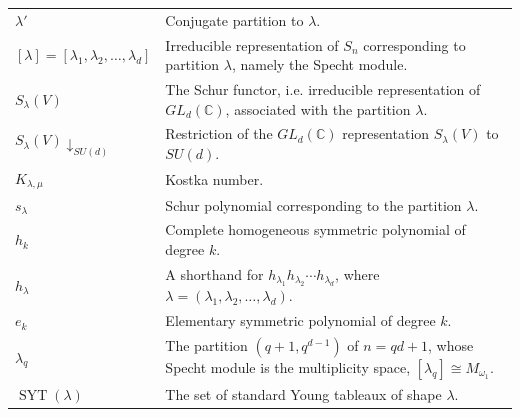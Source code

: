 \documentclass[10pt,twocolumn,superscriptaddress,aps,amsmath,amssymb,citeautoscript,floatfix,prx]{revtex4-2}
\theoremstyle{plain}
\theoremstyle{plain}
\theoremstyle{plain}
\theoremstyle{plain}
\theoremstyle{plain}
\theoremstyle{plain}
\theoremstyle{plain}
\theoremstyle{definition}
\theoremstyle{plain}
\begin{document}
\begin{appendix}
\begin{tabular}{@{}ll@{}}
\parbox[t]{0.22\textwidth}{$\lambda'$} & \parbox[t]{0.72\textwidth}{Conjugate partition to $\lambda$.} \\[0.6em]

\parbox[t]{0.22\textwidth}{$[\lambda]=[\lambda_1,\lambda_2,\ldots,\lambda_d]$} & \parbox[t]{0.72\textwidth}{Irreducible representation of $S_n$ corresponding to partition $\lambda$, namely the Specht module.} \\[0.6em]

\parbox[t]{0.22\textwidth}{$S_{\lambda}(V)$} & \parbox[t]{0.72\textwidth}{The Schur functor, i.e. irreducible representation of $GL_d(\mathbb{C})$, associated with the partition $\lambda$.} \\[0.6em]

\parbox[t]{0.22\textwidth}{$S_\lambda(V) \downarrow_{S U(d)}$} & \parbox[t]{0.72\textwidth}{Restriction of the $GL_d(\mathbb{C})$ representation $S_\lambda(V)$ to $SU(d)$.} \\[0.6em]

\parbox[t]{0.22\textwidth}{$K_{\lambda, \mu}$} & \parbox[t]{0.72\textwidth}{Kostka number.} \\[0.6em]

\parbox[t]{0.22\textwidth}{$s_{\lambda}$} & \parbox[t]{0.72\textwidth}{Schur polynomial corresponding to the partition $\lambda$.} \\[0.6em]

\parbox[t]{0.22\textwidth}{$h_{k}$} & \parbox[t]{0.72\textwidth}{Complete homogeneous symmetric polynomial of degree $k$.} \\[0.6em]

\parbox[t]{0.22\textwidth}{$h_{\lambda}$} & \parbox[t]{0.72\textwidth}{A shorthand for $h_{\lambda_1} h_{\lambda_2} \cdots h_{\lambda_d}$, where $\lambda=(\lambda_1,\lambda_2,\ldots,\lambda_d)$.} \\[0.6em]

\parbox[t]{0.22\textwidth}{$e_k$} & \parbox[t]{0.72\textwidth}{Elementary symmetric polynomial of degree $k$.} \\[0.6em]

\parbox[t]{0.22\textwidth}{$\lambda_q$} & \parbox[t]{0.72\textwidth}{The partition $(q+1,q^{d-1})$ of $n=qd+1$, whose Specht module is the multiplicity space, $[\lambda_q]\cong M_{\omega_1}$.} \\[0.6em]

\parbox[t]{0.22\textwidth}{$\operatorname{SYT}(\lambda)$} & \parbox[t]{0.72\textwidth}{The set of standard Young tableaux of shape $\lambda$.} \\[0.6em]


\end{tabular}
\end{appendix}
\end{document}
